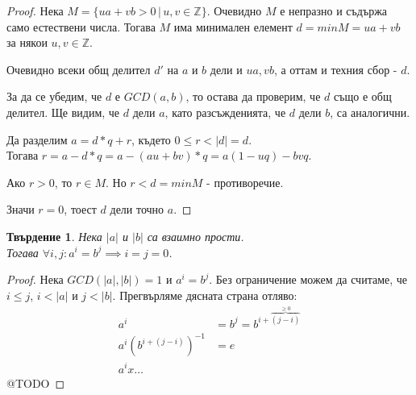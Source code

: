 \documentclass{article}
\newtheorem{prop}{Твърдение}
\theoremstyle{definition}
\newcommand{\ord}[1]{|#1|}
\begin{document}
\begin{proof}
    Нека $M = \{ua + vb > 0\,|\,u, v \in \mathbb Z\}$. Очевидно $M$ е непразно и съдържа само естествени числа. Тогава $M$ има минимален елемент $d = min M = ua + vb$ за някои $u, v \in \mathbb Z$.

    Очевидно всеки общ делител $d'$ на $a$ и $b$ дели и $ua, vb$, а оттам и техния сбор - $d$.

    За да се убедим, че $d$ е $GCD(a, b)$, то остава да проверим, че $d$ също е общ делител. Ще видим, че $d$ дели $a$, като разсъжденията, че $d$ дели $b$, са аналогични.

    Да разделим $a = d*q + r$, където $0 \le r < |d| = d$. \\
    Тогава $r = a - d*q = a - (au + bv)*q = a(1-uq) - bvq$.

    Ако $r > 0$, то $r \in M$. Но $r < d = min M$ - противоречие.

    Значи $r = 0$, тоест $d$ дели точно $a$.
\end{proof}

\begin{prop}
    Нека $\ord a$ и $\ord b$ са взаимно прости. \\
    Тогава $\forall i, j : a^i = b^j \implies i = j = 0$.
\end{prop}

\begin{proof}
    Нека $GCD(|a|,|b|) = 1$ и $a^i = b^j$.
    Без ограничение можем да считаме, че $i \le j$, $i < \ord a$ и $j < \ord b$.
    Прегвърляме дясната страна отляво:
    \begin{align*}
        a^i &= b^j = b^{i + \overbrace{(j-i)}^{\ge 0}}\\
        a^i(b^{i+(j-i)})^{-1} &= e\\
        a^ix \dots
    \end{align*}
    @TODO
\end{proof}
\end{document}
